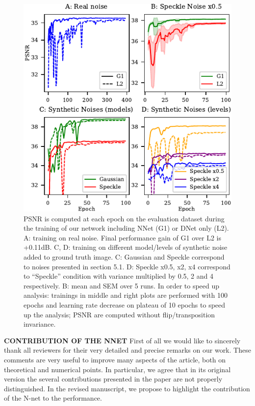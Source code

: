 \documentclass{article}
\begin{document}

\begin{figure}
\begin{center}
\includegraphics[width=\columnwidth]{fig_review.pdf}
\vskip -0.15in
\caption{PSNR is computed at each epoch on the evaluation dataset during the training of our network including NNet (G1) or DNet only (L2). A: training on real noise. Final performance gain of G1 over L2 is +0.11dB. C, D: training on different model/levels of synthetic noise added to ground truth image. C: Gaussian and Speckle correspond to noises presented in section 5.1. D: Speckle x0.5, x2, x4 correspond to “Speckle” condition with variance multiplied by 0.5, 2 and 4 respectively. B: mean and SEM over 5 runs. In order to speed up analysis: trainings in middle and right plots are performed with 100 epochs and learning rate decrease on plateau of 10 epochs to speed up the analysis; PSNR are computed without flip/transposition invariance.}
\label{fig:review}
\end{center}
\vskip -0.35in
\end{figure}

\textbf{CONTRIBUTION OF THE NNET}
First of all we would like to sincerely thank all reviewers for their very detailed and precise remarks on our work. These comments are very useful to improve many aspects of the article, both on theoretical and numerical points. In particular, we agree that in its original version the several contributions presented in the paper are not properly distinguished. In the revised manuscript, we propose to highlight the contribution of the N-net to the performance.
\end{document}
